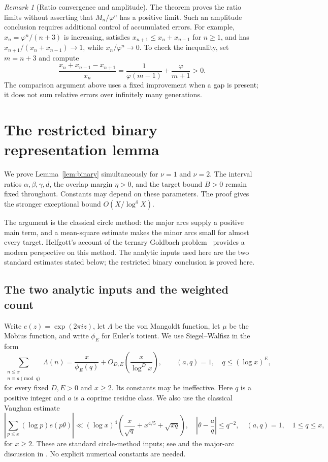 \documentclass[11pt,letterpaper]{article}
\numberwithin{equation}{section}
\theoremstyle{definition}
\theoremstyle{remark}
\newtheorem{remark}[theorem]{Remark}
\newcommand{\ph}{\varphi}
\newcommand{\tot}{\phi_{\!E}}
\begin{document}
\begin{remark}[Ratio convergence and amplitude]
The theorem proves the ratio limits without asserting that $M_n/\ph^n$
has a positive limit. Such an amplitude conclusion requires additional
control of accumulated errors. For example,
$x_n=\ph^n/(n+3)$ is increasing, satisfies
$x_{n+1}\le x_n+x_{n-1}$ for $n\ge1$, and has
$x_{n+1}/(x_n+x_{n-1})\to1$, while $x_n/\ph^n\to0$.
To check the inequality, set $m=n+3$ and compute
\[
 \frac{x_n+x_{n-1}-x_{n+1}}{x_n}
 =\frac1{\ph(m-1)}+\frac\ph{m+1}>0.
\]
The comparison argument above uses a fixed improvement when a gap is
present; it does not sum relative errors over infinitely many generations.
\end{remark}

\appendix
\section{The restricted binary representation lemma}\label{app:binary}

We prove Lemma~\ref{lem:binary} simultaneously for $\nu=1$ and $\nu=2$.
The interval ratios $\alpha,\beta,\gamma,d$, the overlap margin
$\eta>0$, and the target bound $B>0$ remain fixed throughout. Constants
may depend on these parameters. The proof gives the stronger exceptional
bound $O(X/\log^4 X)$.

The argument is the classical circle method: the major arcs supply a
positive main term, and a mean-square estimate makes the minor arcs small
for almost every target. Helfgott's account of the ternary Goldbach
problem~\cite{Helfgott} provides a modern perspective on this method.
The analytic inputs used here are the two standard estimates stated
below; the restricted binary conclusion is proved here.

\subsection{The two analytic inputs and the weighted count}

Write $e(z)=\exp(2\pi iz)$, let $\Lambda$ be the von Mangoldt function,
let $\mu$ be the M\"obius function, and write $\tot$ for Euler's totient.
We use Siegel--Walfisz in the form
\begin{equation}\label{app:sw}
 \sum_{\substack{n\le x\\n\equiv a\pmod q}}\Lambda(n)
 =\frac{x}{\tot(q)}+O_{D,E}\left(\frac{x}{\log^D x}\right),
 \qquad (a,q)=1,\quad q\le(\log x)^E,
\end{equation}
for every fixed $D,E>0$ and $x\ge2$. Its constants may be ineffective.
Here $q$ is a positive integer and $a$ is a coprime residue class.
We also use the classical Vaughan estimate
\begin{equation}\label{app:vaughan}
 \left|\sum_{p\le x}(\log p)e(p\theta)\right|
 \ll(\log x)^4
 \left(\frac{x}{\sqrt q}+x^{4/5}+\sqrt{xq}\right),
 \quad
 \left|\theta-\frac aq\right|\le q^{-2},\quad
 (a,q)=1,\quad 1\le q\le x,
\end{equation}
for $x\ge2$. These are standard circle-method inputs; see
\cite[Theorem~3.1]{Vaughan} and the major-arc discussion in
\cite[Proposition~24]{Tao}. No explicit numerical constants are needed.
\end{document}
